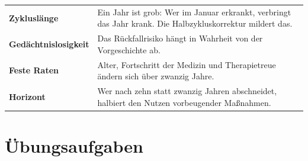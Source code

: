 \begin{warnung}
\begin{center}
{\small
\renewcommand{\arraystretch}{1.52}
\begin{tabular}{@{}P{3.2cm}P{5.4cm}@{}}
\toprule
\textbf{Zykluslänge} & Ein Jahr ist grob: Wer im Januar erkrankt, verbringt das Jahr krank. Die Halbzykluskorrektur mildert das.\\
\textbf{Gedächtnis\-losigkeit} & Das Rückfallrisiko hängt in Wahrheit von der Vorgeschichte ab.\\
\textbf{Feste Raten} & Alter, Fortschritt der Medizin und Therapietreue ändern sich über zwanzig Jahre.\\
\textbf{Horizont} & Wer nach zehn statt zwanzig Jahren abschneidet, halbiert den Nutzen vorbeugender Maßnahmen.\\
\bottomrule
\end{tabular}}
\end{center}

\begin{center}
\begin{minipage}{0.88\textwidth}
\end{minipage}
\end{center}
\end{warnung}

\section{Übungsaufgaben}

